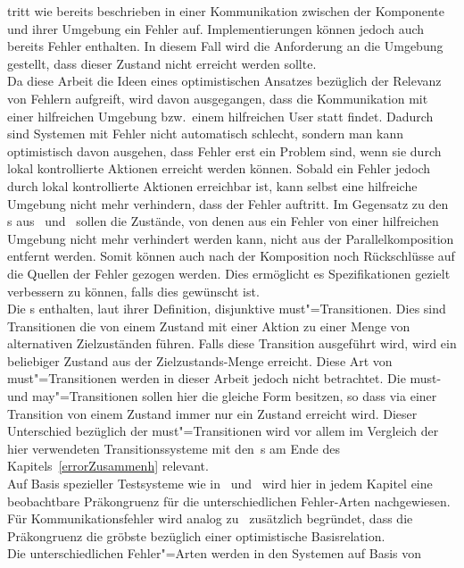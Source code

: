 tritt wie bereits beschrieben in einer Kommunikation zwischen der Komponente
und ihrer Umgebung ein Fehler auf. Implementierungen können jedoch auch bereits
Fehler enthalten. In diesem Fall wird die Anforderung an die Umgebung gestellt,
dass dieser Zustand nicht erreicht werden sollte.\\
Da diese Arbeit die Ideen eines optimistischen Ansatzes bezüglich der Relevanz
von Fehlern aufgreift, wird davon ausgegangen, dass die Kommunikation
mit einer hilfreichen Umgebung bzw.\ einem hilfreichen User statt findet.
Dadurch sind Systemen mit Fehler nicht automatisch schlecht, sondern man kann
optimistisch davon ausgehen, dass Fehler erst ein Problem sind, wenn sie durch
lokal kontrollierte Aktionen erreicht werden können. Sobald ein Fehler jedoch
durch lokal kontrollierte Aktionen erreichbar ist, kann
selbst eine hilfreiche Umgebung nicht mehr verhindern, dass der Fehler
auftritt. Im Gegensatz zu den \MIA{}s aus~\cite{Luttgen2013MIA1}
und~\cite{Vogler2016MIA3} sollen die Zustände, von denen aus ein Fehler von
einer hilfreichen Umgebung nicht mehr verhindert werden kann, nicht aus der
Parallelkomposition entfernt werden. Somit können auch nach der Komposition
noch Rückschlüsse auf die Quellen der Fehler gezogen werden. Dies ermöglicht
es Spezifikationen gezielt verbessern zu können, falls dies gewünscht ist.\\
Die \MIA{}s enthalten, laut ihrer Definition, disjunktive must"=Transitionen.
Dies sind Transitionen die von einem Zustand mit einer Aktion zu einer Menge
von alternativen Zielzuständen führen. Falls diese Transition ausgeführt wird,
wird ein beliebiger Zustand aus der Zielzustands-Menge erreicht. Diese Art von
must"=Transitionen werden in dieser Arbeit jedoch nicht betrachtet. Die must-
und may"=Transitionen sollen hier die gleiche Form besitzen, so dass via einer
Transition von einem Zustand immer nur ein Zustand erreicht wird. Dieser
Unterschied bezüglich der must"=Transitionen wird vor allem im Vergleich der
hier verwendeten Transitionssysteme mit den~\MIA{}s am Ende des
Kapitels~\ref{errorZusammenh} relevant.\\
Auf Basis spezieller Testsysteme wie in~\cite{Vogler2015FailSem}
und~\cite{Vogler2017dMTS} wird hier in jedem Kapitel eine beobachtbare
Präkongruenz für die unterschiedlichen Fehler-Arten nachgewiesen. Für
Kommunikationsfehler wird analog zu~\cite{Schinko2016BA} zusätzlich begründet,
dass die Präkongruenz die gröbste bezüglich einer optimistische
Basisrelation.\\
Die unterschiedlichen Fehler"=Arten werden in den Systemen auf Basis von

